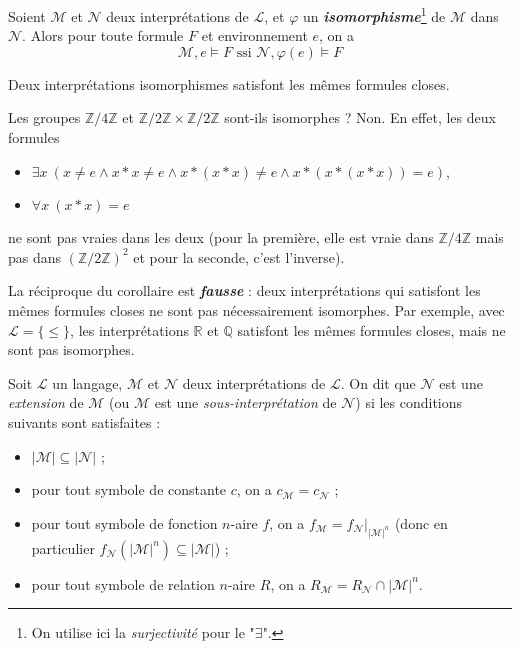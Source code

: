 \documentclass[./main]{subfiles}
\begin{document}
  \begin{lem}
    Soient $\mathcal{M}$ et $\mathcal{N}$ deux interprétations de $\mathcal{L}$, et $\varphi$ un \textit{\textbf{isomorphisme}}\footnote{On utilise ici la \textit{surjectivité} pour le "$\exists $".} de $\mathcal{M}$ dans $\mathcal{N}$. Alors pour toute formule $F$ et environnement $e$, on a \[
      \mathcal{M}, e \models F \text{ ssi } \mathcal{N}, \varphi(e) \models F
    \]
  \end{lem}

  \begin{crlr}
    Deux interprétations isomorphismes satisfont les mêmes formules closes.
  \end{crlr}

  \begin{exo}
    Les groupes $\mathds{Z} / 4 \mathds{Z}$ et $\mathds{Z} / 2 \mathds{Z} \times \mathds{Z} / 2 \mathds{Z}$ sont-ils isomorphes ?
    Non. En effet, les deux formules 
    \begin{itemize}
      \item $\exists x\: (x \neq e \land x * x \neq e \land x * (x * x) \neq e \land x * (x * (x * x)) = e)$,
      \item $\forall x \: (x*x) = e$
    \end{itemize}
    ne sont pas vraies dans les deux (pour la première, elle est vraie dans $\mathds{Z} / 4 \mathds{Z}$ mais pas dans $(\mathds{Z} / 2 \mathds{Z})^2$ et pour la seconde, c'est l'inverse).
  \end{exo}

  \begin{rmk}
    La réciproque du corollaire est \textit{\textbf{fausse}} : deux interprétations qui satisfont les mêmes formules closes ne sont pas nécessairement isomorphes.
    Par exemple, avec $\mathcal{L} = \{{\le}\}$, les interprétations $\mathds{R}$ et $\mathds{Q}$ satisfont les mêmes formules closes, mais ne sont pas isomorphes.
  \end{rmk}

  \begin{defn}
    Soit $\mathcal{L}$ un langage, $\mathcal{M}$ et $\mathcal{N}$ deux interprétations de $\mathcal{L}$.
    On dit que $\mathcal{N}$ est une \textit{extension} de $\mathcal{M}$ (ou $\mathcal{M}$ est une \textit{sous-interprétation} de $\mathcal{N}$) si les conditions suivants sont satisfaites :
    \begin{itemize}
      \item $|\mathcal{M}| \subseteq |\mathcal{N}|$ ;
      \item pour tout symbole de constante $c$, on a $c_\mathcal{M} = c_\mathcal{N}$ ;
      \item pour tout symbole de fonction $n$-aire $f$, on a $f_\mathcal{M} = f_\mathcal{N}\big|_{|\mathcal{M}|^n}$ (donc en particulier $f_\mathcal{N}(|\mathcal{M}|^n) \subseteq |\mathcal{M}|$) ;
      \item pour tout symbole de relation $n$-aire $R$, on a $R_\mathcal{M} = R_\mathcal{N} \cap |\mathcal{M}|^n$.
    \end{itemize}
  \end{defn}
\end{document}
